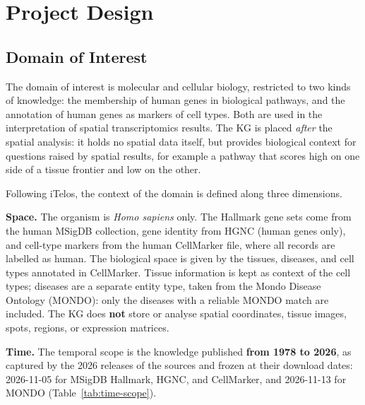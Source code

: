\section{Project Design}

\subsection{Domain of Interest}

The domain of interest is molecular and cellular biology, restricted to two kinds of knowledge: the membership of human genes in biological pathways, and the annotation of human genes as markers of cell types. Both are used in the interpretation of spatial transcriptomics results. The KG is placed \emph{after} the spatial analysis: it holds no spatial data itself, but provides biological context for questions raised by spatial results, for example a pathway that scores high on one side of a tissue frontier and low on the other.

\noindent Following iTelos, the context of the domain is defined along three dimensions.

\medskip\noindent\textbf{Space.} The organism is \emph{Homo sapiens} only. The Hallmark gene sets come from the human MSigDB collection, gene identity from HGNC (human genes only), and cell-type markers from the human CellMarker file, where all records are labelled as human. The biological space is given by the tissues, diseases, and cell types annotated in CellMarker. Tissue information is kept as context of the cell types; diseases are a separate entity type, taken from the Mondo Disease Ontology (MONDO): only the diseases with a reliable MONDO match are included. The KG does \textbf{not} store or analyse spatial coordinates, tissue images, spots, regions, or expression matrices.

\medskip\noindent\textbf{Time.} The temporal scope is the knowledge published \textbf{from 1978 to 2026}, as captured by the 2026 releases of the sources and frozen at their download dates: 2026-11-05 for MSigDB Hallmark, HGNC, and CellMarker, and 2026-11-13 for MONDO (Table~\ref{tab:time-scope}).

